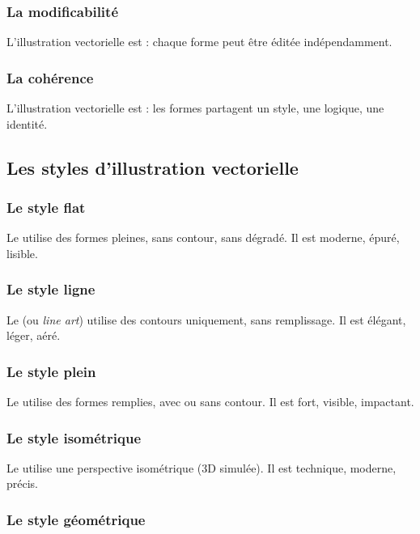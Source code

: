 \subsubsection{La modificabilité}

L'illustration vectorielle est  : chaque forme peut être éditée indépendamment.

\subsubsection{La cohérence}

L'illustration vectorielle est  : les formes partagent un style, une logique, une identité.

\subsection{Les styles d'illustration vectorielle}

\subsubsection{Le style flat}

Le  utilise des formes pleines, sans contour, sans dégradé. Il est moderne, épuré, lisible.

\subsubsection{Le style ligne}

Le  (ou \emph{line art}) utilise des contours uniquement, sans remplissage. Il est élégant, léger, aéré.

\subsubsection{Le style plein}

Le  utilise des formes remplies, avec ou sans contour. Il est fort, visible, impactant.

\subsubsection{Le style isométrique}

Le  utilise une perspective isométrique (3D simulée). Il est technique, moderne, précis.

\subsubsection{Le style géométrique}

